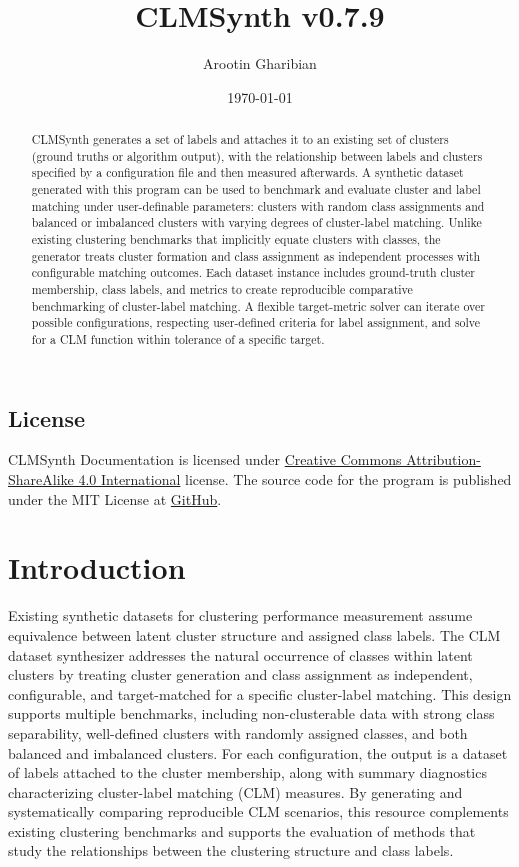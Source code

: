 \documentclass[a4paper,12pt]{article}
\title{CLMSynth v0.7.9}
\author{Arootin Gharibian}
\date{\today}
\begin{document}
\maketitle

\begin{abstract}
CLMSynth generates a set of labels and attaches it to an existing set of clusters (ground truths or algorithm output), with the relationship between labels and clusters specified by a configuration file and then measured afterwards. A synthetic dataset generated with this program can be used to benchmark and evaluate cluster and label matching under user-definable parameters: clusters with random class assignments and balanced or imbalanced clusters with varying degrees of cluster-label matching. Unlike existing clustering benchmarks that implicitly equate clusters with classes, the generator treats cluster formation and class assignment as independent processes with configurable matching outcomes. Each dataset instance includes ground-truth cluster membership, class labels, and metrics to create reproducible comparative benchmarking of cluster-label matching. A flexible target-metric solver can iterate over possible configurations, respecting user-defined criteria for label assignment, and solve for a CLM function within tolerance of a specific target.

\end{abstract}

\subsection*{License}
CLMSynth Documentation is licensed under \href{https://creativecommons.org/licenses/by-sa/4.0/}{Creative Commons Attribution-ShareAlike 4.0 International} license. The source code for the program is published under the MIT License at \href{https://github.com/A-Gharibian/CLMSynth}{GitHub}.

\newpage
\section{Introduction}
Existing synthetic datasets for clustering performance measurement assume equivalence between latent cluster structure and assigned class labels. The CLM dataset synthesizer addresses the natural occurrence of classes within latent clusters by treating cluster generation and class assignment as independent, configurable, and target-matched for a specific cluster-label matching. This design supports multiple benchmarks, including non-clusterable data with strong class separability, well-defined clusters with randomly assigned classes, and both balanced and imbalanced clusters. For each configuration, the output is a dataset of labels attached to the cluster membership, along with summary diagnostics characterizing cluster-label matching (CLM) measures. By generating and systematically comparing reproducible CLM scenarios, this resource complements existing clustering benchmarks and supports the evaluation of methods that study the relationships between the clustering structure and class labels.
\end{document}
